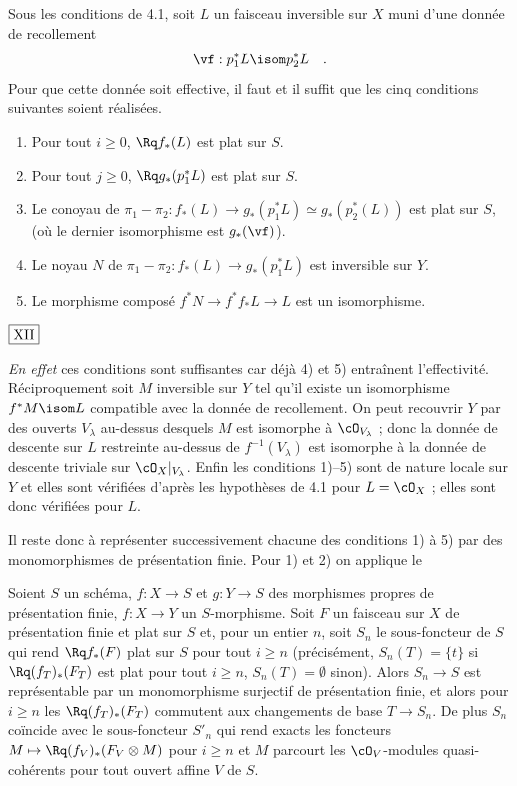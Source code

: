 \begin{lem}\label{lem:4.3} Sous les conditions de \textup{4.1}, soit $L$ un faisceau inversible sur $X$ muni d'une donnée de recollement
\[
\vf : p_1^*L \isom p_2^*L \quad .
\]
Pour que cette donnée soit effective, il faut et il suffit que les cinq conditions suivantes soient réalisées.
\begin{enumerate}[label={\arabic*)}]
\item Pour tout $i \geq 0$, $\Rq f_*(L)$ est plat sur $S$.
\item Pour tout $j \geq 0$, $\Rq g_*(p_1^*L)$ est plat sur $S$.
\item Le conoyau de $\pi_1 - \pi_2 : f_*(L) \to g_*(p_1^*L) \simeq g_*(p_2^*(L))$ est plat sur $S$, (où le dernier isomorphisme est $g_*(\vf)$).
\item Le noyau $N$ de $\pi_1 - \pi_2 : f_*(L) \to g_*(p_1^*L)$ est inversible sur $Y$.
\item Le morphisme composé $f^*N \to f^*f_*L \to L$ est un isomorphisme.
\end{enumerate}
\end{lem}

\begin{flushright}
$\fbox{\text{XII}}$
\end{flushright}

\noindent\textit{En effet} ces conditions sont suffisantes car déjà 4) et 5) entraînent l'effectivité. Réciproquement soit $M$ inversible sur $Y$ tel qu'il existe un isomorphisme $f^*M \isom L$ compatible avec la donnée de recollement. On peut recouvrir $Y$ par des ouverts $V_{\lambda}$ au-dessus desquels $M$ est isomorphe à $\cO_{V_{\lambda}}$ ; donc la donnée de descente sur $L$ restreinte au-dessus de $f^{-1}(V_{\lambda})$ est isomorphe à la donnée de descente triviale sur $\cO_X|_{V_{\lambda}}$. Enfin les conditions 1)--5) sont de nature locale sur $Y$ et elles sont vérifiées d'après les hypothèses de 4.1 pour $L = \cO_X$ ; elles sont donc vérifiées pour $L$.

Il reste donc à représenter successivement chacune des conditions 1) à 5) par des monomorphismes de présentation finie. Pour 1) et 2) on applique le

\begin{lem}\label{lem:4.4} Soient $S$ un schéma, $f : X \to S$ et $g : Y \to S$ des morphismes propres de présentation finie, $f : X \to Y$ un $S$-morphisme. Soit $F$ un faisceau sur $X$ de présentation finie et plat sur $S$ et, pour un entier $n$, soit $S_n$ le sous-foncteur de $S$ qui rend $\Rq f_*(F)$ plat sur $S$ pour tout $i \geq n$ (précisément, $S_n(T) = \{t\}$ si $\Rq (f_T)_*(F_T)$ est plat pour tout $i \geq n$, $S_n(T) = \emptyset$ sinon). Alors $S_n \to S$ est représentable par un monomorphisme surjectif de présentation finie, et alors pour $i \geq n$ les $\Rq (f_T)_*(F_T)$ commutent aux changements de base $T \to S_n$. De plus $S_n$ coïncide avec le sous-foncteur $S'_n$ qui rend exacts les foncteurs $M \mapsto \Rq (f_V)_*(F_V \otimes M)$ pour $i \geq n$ et $M$ parcourt les $\cO_V$-modules quasi-cohérents pour tout ouvert affine $V$ de $S$.
\end{lem}

